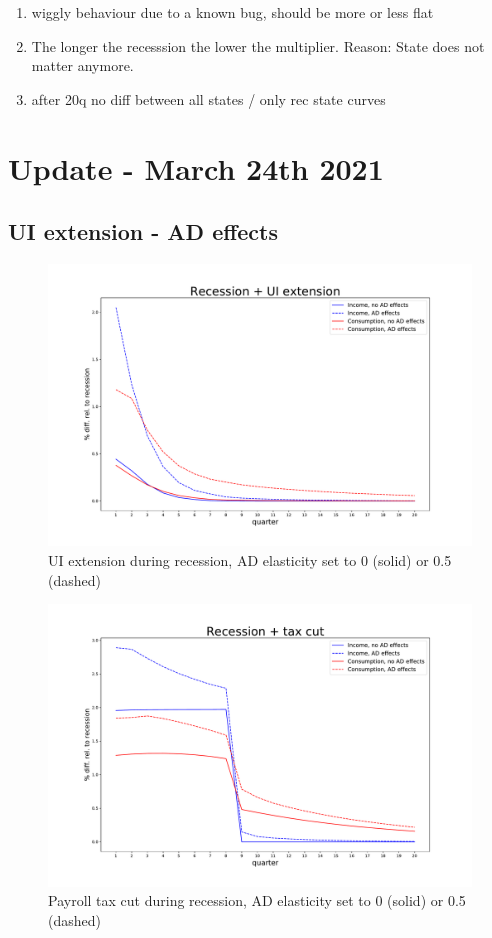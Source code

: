 \documentclass[]{article}
\begin{document}
\begin{enumerate}
	\item wiggly behaviour due to a known bug, should be more or less flat
	\item The longer the recesssion the lower the multiplier. Reason: State does not matter anymore. 
	\item after 20q no diff between all states / only rec state curves
\end{enumerate}



\newpage
\FloatBarrier	
\section{Update - March 24th 2021}

\FloatBarrier
\subsection{UI extension - AD effects}



\begin{figure}[h]
	\centering
	\includegraphics[width=0.7\linewidth]{../UI_AD05_new/recession_UI_relrecession}
	\caption{UI extension during recession, AD elasticity set to 0 (solid) or 0.5 (dashed)}
	\label{fig:recessionuirelrecession}
\end{figure}

\begin{figure}[h]
	\centering
	\includegraphics[width=0.7\linewidth]{../Full_Run_Mar5/recession_taxcut_relrecession}
	\caption{Payroll tax cut during recession, AD elasticity set to 0 (solid) or 0.5 (dashed)}
	\label{fig:recessiontaxcutrelrecession_statedep}
\end{figure}
\end{document}
